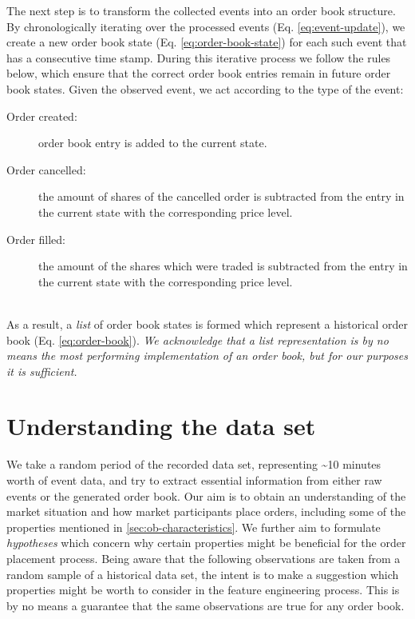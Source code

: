 The next step is to transform the collected events into an order book structure.
By chronologically iterating over the processed events (Eq. \ref{eq:event-update}), we create a new order book state (Eq. \ref{eq:order-book-state}) for each such event that has a consecutive time stamp.
During this iterative process we follow the rules below, which ensure that the correct order book entries remain in future order book states.
Given the observed event, we act according to the type of the event:
\begin{description}
    \item[Order created:] order book entry is added to the current state.
    \item[Order cancelled:] the amount of shares of the cancelled order is subtracted from the entry in the current state with the corresponding price level.
    \item[Order filled:] the amount of the shares which were traded is subtracted from the entry in the current state with the corresponding price level.
\end{description}
\hfill
\\
As a result, a \textit{list} of order book states is formed which represent a historical order book (Eq. \ref{eq:order-book}).
\textit{We acknowledge that a list representation is by no means the most performing implementation of an order book, but for our purposes it is sufficient.}

\vfill

\section{Understanding the data set}

We take a random period of the recorded data set, representing \textasciitilde10 minutes worth of event data, and try to extract essential information from either raw events or the generated order book.
Our aim is to obtain an understanding of the market situation and how market participants place orders, including some of the properties mentioned in \ref{sec:ob-characteristics}.
We further aim to formulate \textit{hypotheses} which concern why certain properties might be beneficial for the order placement process.
Being aware that the following observations are taken from a random sample of a historical data set, the intent is to make a suggestion which properties might be worth to consider in the feature engineering process.
This is by no means a guarantee that the same observations are true for any order book.

